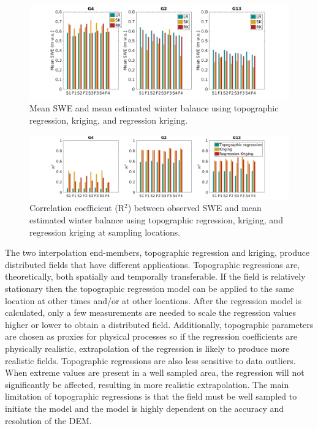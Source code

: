 \documentclass{sfuthesis}
\begin{document}
\begin{landscape}
\begin{figure}
	\includegraphics[height=0.38\textwidth]{InterpMethod_allopts.png}%
	\caption{Mean SWE and mean estimated winter balance using topographic regression, kriging, and regression kriging.}
	\label{fig:InterpMethod_allopts}
\end{figure}

\begin{figure}
	\includegraphics[height=0.38\textwidth]{InterpMethod_alloptsR2.png}%
	\caption{Correlation coefficient (R$^2$) between observed SWE and mean estimated winter balance using topographic regression, kriging, and regression kriging at sampling locations.}
	\label{fig:InterpMethod_alloptsR2}
\end{figure}
\end{landscape}

The two interpolation end-members, topographic regression and kriging, produce distributed fields that have different applications. Topographic regressions are, theoretically, both spatially and temporally transferable. If the field is relatively stationary then the topographic regression model can be applied to the same location at other times and/or at other locations. After the regression model is calculated, only a few measurements are needed to scale the regression values higher or lower to obtain a distributed field. Additionally, topographic parameters are chosen as proxies for physical processes so if the regression coefficients are physically realistic, extrapolation of the regression is likely to produce more realistic fields. Topographic regressions are also less sensitive to data outliers. When extreme values are present in a well sampled area, the regression will not significantly be affected, resulting in more realistic extrapolation. The main limitation of topographic regressions is that the field must be well sampled to initiate the model and the model is highly dependent on the accuracy and resolution of the DEM. 
\end{document}
